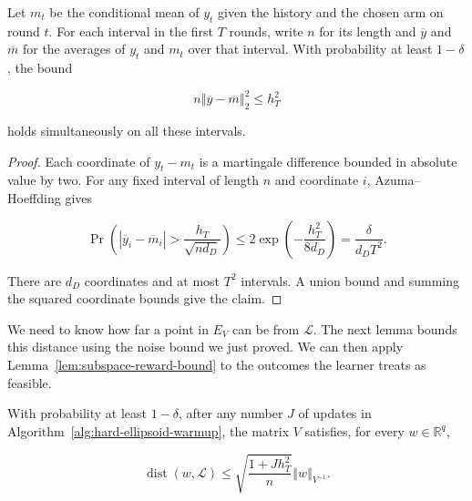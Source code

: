 {{\begin{lemma}\label{lem:interval-noise}

  Let $m_{t}$ be the conditional mean of $y_{t}$ given the history and the
  chosen arm on round $t$. For each interval in the first $T$ rounds,
  write $n$ for its length and $\overline{y}$ and $\overline{m}$ for the
  averages of $y_{t}$ and $m_{t}$ over that interval. With probability at
  least $1 - \delta$, the bound



\begin{equation}
n {\left\Vert \overline{y} - \overline{m} \right\Vert}_{2}^{2} \le h_{T}^{2}\label{eq:soft-interval-noise}
\end{equation}



  holds simultaneously on all these intervals.

\end{lemma}


\begin{proof}
Each coordinate of $y_{t} - m_{t}$ is a martingale difference
bounded in absolute value by two. For any fixed interval of length
$n$ and coordinate $i$, Azuma--Hoeffding gives


\begin{equation*}
\operatorname{Pr} \left( \left| {\overline{y}}_{i} - {\overline{m}}_{i} \right| > \frac{h_{T}}{\sqrt{n d_{D}}} \right) \le 2 \operatorname{exp} \left( - \frac{h_{T}^{2}}{8 d_{D}} \right) = \frac{\delta}{d_{D} T^{2}} .
\end{equation*}


There are $d_{D}$ coordinates and at most $T^{2}$ intervals. A union bound
and summing the squared coordinate bounds give the claim.
\end{proof}

We need to know how far a point in $E_{V}$ can be from $\mathcal{L}$.
The next lemma bounds this distance using the noise bound we just
proved. We can then apply Lemma~\ref{lem:subspace-reward-bound} to the outcomes
the learner treats as feasible.


\begin{lemma}\label{lem:subspace-distance-bound}

  With probability at least $1 - \delta$, after any number $J$ of updates
  in Algorithm~\ref{alg:hard-ellipsoid-warmup}, the matrix $V$ satisfies, for every
  $w \in \mathbb{R}^{q}$,


\begin{equation*}
\operatorname{dist} \left( w , \mathcal{L} \right) \le \sqrt{\frac{1 + J h_{T}^{2}}{n}} {\left\Vert w \right\Vert}_{V^{- 1}} .
\end{equation*}



\end{lemma}}}

